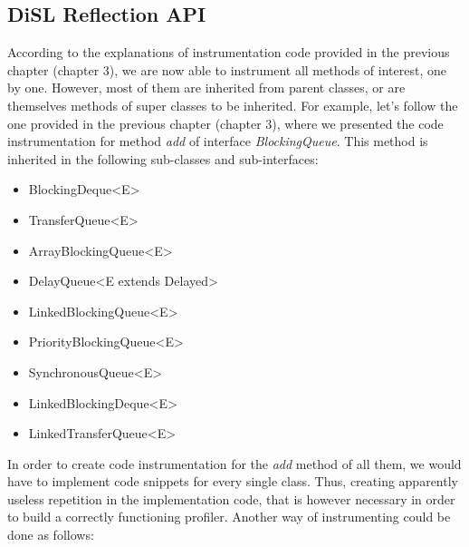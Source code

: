 \documentclass[]{usiinfthesis}
\begin{document}
\subsection{DiSL Reflection API}
According to the explanations of instrumentation code provided in the previous chapter (chapter  3), we are now able to instrument all methods of interest, one by one. However, most of them are inherited from parent classes, or are themselves methods of super classes  to be inherited. For example, let's follow the one provided in the previous chapter (chapter 3), where we presented the code instrumentation for method \textit{add} of interface \textit{BlockingQueue}. This method is inherited in the following sub-classes and sub-interfaces:  
\begin{itemize}
    \item BlockingDeque<E>
    \item TransferQueue<E>
    \item ArrayBlockingQueue<E>
    \item DelayQueue<E extends Delayed>
    \item LinkedBlockingQueue<E>
    \item PriorityBlockingQueue<E>
    \item SynchronousQueue<E>
    \item LinkedBlockingDeque<E>
    \item LinkedTransferQueue<E>
\end{itemize}
In order to create code instrumentation for the \textit{add} method of all them, we would have to implement code snippets for every single class. Thus, creating apparently useless repetition in the implementation code, that is however necessary in order to build a correctly functioning profiler. Another way of instrumenting could be done as follows:
\end{document}
